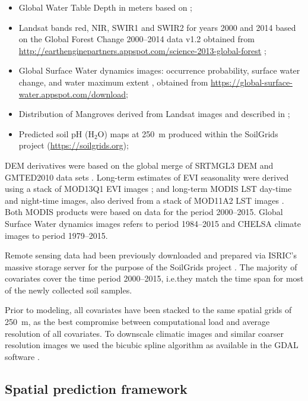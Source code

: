 \begin{linenumbers}
\begin{itemize}
  \item Global Water Table Depth in meters based on \citet{fan2013global};
  \item Landsat bands red, NIR, SWIR1 and SWIR2 for years 2000 and 2014 based on the Global Forest Change 2000--2014 data v1.2 obtained from \url{http://earthenginepartners.appspot.com/science-2013-global-forest} \citep{hansen2013high};
  \item Global Surface Water dynamics images: occurrence probability, surface water change, and water maximum extent \citep{pekel2016high}, obtained from \url{https://global-surface-water.appspot.com/download};
  \item Distribution of Mangroves derived from Landsat images and described in \citet{giri2011status};
  \item Predicted soil pH (H$_2$O) maps at \SI{250}{\metre} produced within the SoilGrids project (\url{https://soilgrids.org});
\end{itemize}

DEM derivatives were based on the global merge of SRTMGL3 DEM and GMTED2010 data sets \citep{Danielson2011GMTED}. Long-term estimates of EVI seasonality were derived using a stack of MOD13Q1 EVI images \citep{Savtchenko2004ASR}; and long-term MODIS LST day-time and night-time images, also derived from a stack of MOD11A2 LST images \citep{wan2006modis}. Both MODIS products were based on data for the period 2000--2015. Global Surface Water dynamics images refers to period 1984--2015 and CHELSA climate images to period 1979--2015.\par

Remote sensing data had been previously downloaded and prepared via ISRIC's massive storage server for the purpose of the SoilGrids project \citep{Hengl2016SoilGrids250}. The majority of covariates cover the time period 2000--2015, i.e.\@ they match the time span for most of the newly collected soil samples.\par

Prior to modeling, all covariates have been stacked to the same spatial grids of \SI{250}{\metre}, as the best compromise between computational load and average resolution of all covariates. To downscale climatic images and similar coarser resolution images we used the bicubic spline algorithm as available in the GDAL software \citep{mitchell2014geospatial}.\par

\subsection{Spatial prediction framework}


\end{linenumbers}
